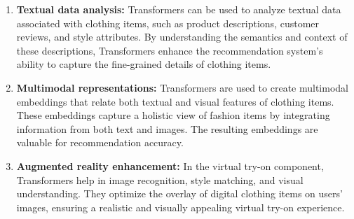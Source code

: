 	\begin{enumerate}
		\item \textbf{Textual data analysis:} Transformers can be used to analyze textual data associated with clothing items, such as product descriptions, customer reviews, and style attributes. By understanding the semantics and context of these descriptions, Transformers enhance the recommendation system's ability to capture the fine-grained details of clothing items.
		\item \textbf{Multimodal representations:} Transformers are used to create multimodal embeddings that relate both textual and visual features of clothing items. These embeddings capture a holistic view of fashion items by integrating information from both text and images. The resulting embeddings are valuable for recommendation accuracy.
		\item \textbf{Augmented reality enhancement:} In the virtual try-on component, Transformers help in image recognition, style matching, and visual understanding. They optimize the overlay of digital clothing items on users' images, ensuring a realistic and visually appealing virtual try-on experience.
	\end{enumerate}